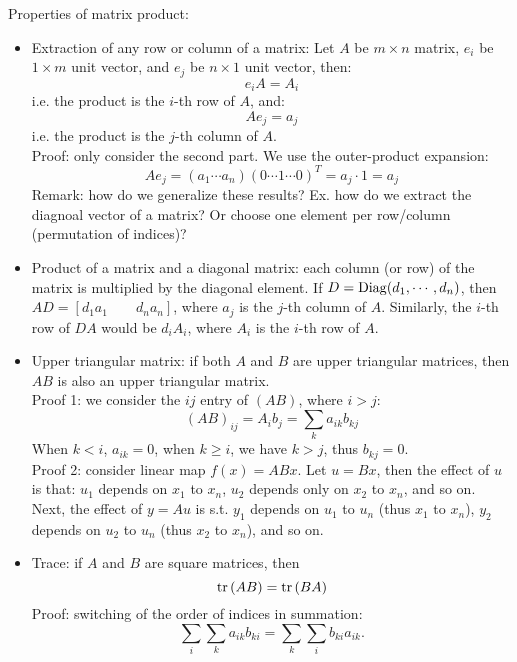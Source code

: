 \documentclass{report}
\begin{document}
Properties of matrix product: 
\begin{itemize}
\item Extraction of any row or column of a matrix: Let $A$ be $m \times n$ matrix, $e_i$ be $1 \times m$ unit vector, and $e_j$ be $n \times 1$ unit vector, then:
\begin{equation}
e_i A = A_i	
\end{equation}
i.e. the product is the $i$-th row of $A$, and:
\begin{equation}
A e_j = a_j	
\end{equation}
i.e. the product is the $j$-th column of $A$. \\
Proof: only consider the second part. We use the outer-product expansion: 
\begin{equation}
A e_j = (a_1 \cdots a_n) (0 \cdots 1 \cdots 0)^T = a_j \cdot 1 = a_j
\end{equation}
Remark: how do we generalize these results? Ex. how do we extract the diagnoal vector of a matrix? Or choose one element per row/column (permutation of indices)? 

\item Product of a matrix and a diagonal matrix: each column (or row) of the matrix is multiplied by the diagonal element. If $D = {\rm Diag}(d_1, \cdots, d_n)$, then $AD = [d_1 a_1 \qquad d_n a_n]$, where $a_j$ is the $j$-th column of $A$. Similarly, the $i$-th row of $DA$ would be $d_i A_i$, where $A_i$ is the $i$-th row of $A$.  

\item Upper triangular matrix: if both $A$ and $B$ are upper triangular matrices, then $AB$ is also an upper triangular matrix. \\
Proof 1: we consider the $ij$ entry of $(AB)$, where $i > j$: 
\begin{equation}
(AB)_{ij} = A_i b_j = \sum_k a_{ik} b_{kj}	
\end{equation}
When $k < i$, $a_{ik} = 0$, when $k \geq i$, we have $k > j$, thus $b_{kj} = 0$. \\
Proof 2: consider linear map $f(x) = ABx$. Let $u = Bx$, then the effect of $u$ is that: $u_1$ depends on $x_1$ to $x_n$, $u_2$ depends only on $x_2$ to $x_n$, and so on. Next, the effect of $y = Au$ is s.t. $y_1$ depends on $u_1$ to $u_n$ (thus $x_1$ to $x_n$), $y_2$ depends on $u_2$ to $u_n$ (thus $x_2$ to $x_n$), and so on.  

\item Trace: if $A$ and $B$ are square matrices, then 
\begin{equation}
{\rm tr}\,(AB) = {\rm tr}\,(BA)	
\end{equation}
Proof: switching of the order of indices in summation: 
\begin{equation}
\sum_i \sum_k a_{ik} b_{ki} = \sum_k \sum_i b_{ki} a_{ik}.
\end{equation}


\end{itemize}
\end{document}
